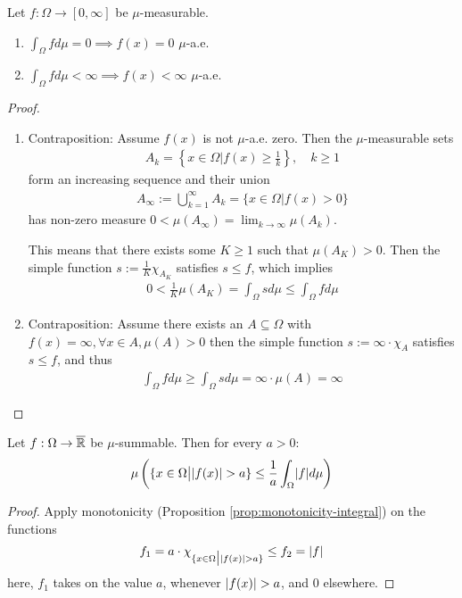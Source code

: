 \begin{prop}
  Let $f: \Omega \to [0,\infty]$ be $\mu$-measurable.
  \begin{enumerate}
    \item $\int_{\Omega} f d \mu = 0 \implies f(x) = 0$ $\mu$-a.e.
    \item $\int_{\Omega} f d \mu < \infty \implies f(x) < \infty$ $\mu$-a.e.
  \end{enumerate}
\end{prop}
\begin{proof}
\begin{enumerate}
  \item Contraposition: Assume $f(x)$ is not $\mu$-a.e. zero. Then the $\mu$-measurable sets
    \begin{align*}
      A_k = \left\{x \in \Omega \big\vert f(x) \geq \frac{1}{k}\right\}, \quad k \geq 1
    \end{align*}
    form an increasing sequence and their union
    \begin{align*}
      A_{\infty} := \bigcup_{k=1}^{\infty} A_k = \{x \in \Omega \big\vert f(x) > 0\}
    \end{align*}
    has non-zero measure $0 < \mu(A_{\infty}) = \lim_{k \to \infty} \mu(A_k)$.

    This means that there exists some $K \geq 1$ such that $\mu(A_K) > 0$.
    Then the simple function 
    $s := \frac{1}{K} \chi_{A_K}$
    satisfies $s \leq f$, which implies
    \begin{align*}
      0 < \frac{1}{K} \mu(A_K) = \int_{\Omega} s d \mu \leq \int_{\Omega} f d \mu
    \end{align*}
  \item Contraposition: Assume there exists an $A \subseteq \Omega$ with
    $f(x) = \infty, \forall x \in A, \mu(A) > 0$
    then the simple function
    $s := \infty \cdot \chi_{A}$ satisfies $s \leq f$, and thus
    \begin{align*}
      \int_{\Omega} f d \mu \geq \int_{\Omega} s d \mu = \infty \cdot \mu(A) = \infty
    \end{align*}
\end{enumerate}
\end{proof}


\begin{thm}\label{thm:tchebychev-inequality}
  Let $f: \Omega \to \overline{\mathbb{R}}$ be $\mu$-summable. Then for every $a > 0$:
  \begin{align*}
    \mu\left(
      \{x \in \Omega \big\vert \abs{f(x)} > a\}
      \leq \frac{1}{a} \int_{\Omega} \abs{f} d \mu
    \right)
  \end{align*}
\end{thm}
\begin{proof}
  Apply monotonicity (Proposition \ref{prop:monotonicity-integral}) on the functions
  \begin{align*}
      f_1 = a \cdot \chi_{\{x \in \Omega \big\vert \vert f(x)\vert > a\}} \leq f_2 = \vert f\vert
  \end{align*}
  here, $f_1$ takes on the value $a$, whenever $\vert f(x)\vert > a$, and $0$ elsewhere.
\end{proof}

